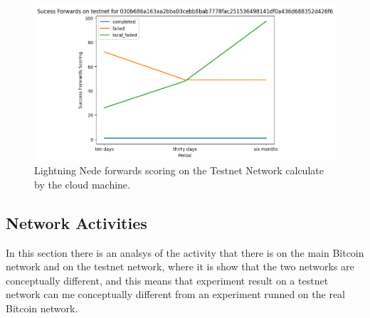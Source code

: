 \begin{figure}
    \begin{center}
      \includegraphics[scale=0.7]{imgs/testnet_forwards.png}
    \end{center}
    \caption{Lightning Nede forwards scoring on the Testnet Network calculate by the cloud machine.}
    \label{fig:lnmetrics_forwards_testnet}
\end{figure}


\subsection{Network Activities}

In this section there is an analsys of the activity that there is on the main 
Bitcoin network and on the testnet network, where it is show that the two networks 
are conceptually different, and this means that experiment result on a testnet network 
can me conceptually different from an experiment runned on the real Bitcoin network.
